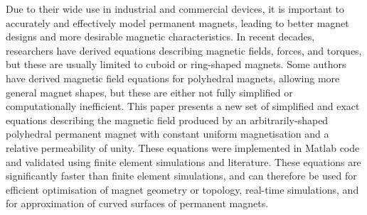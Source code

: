 Due to their wide use in industrial and commercial devices, it is important to accurately and effectively model permanent magnets, leading to better magnet designs and more desirable magnetic characteristics. In recent decades, researchers have derived equations describing magnetic fields, forces, and torques, but these are usually limited to cuboid or ring-shaped magnets. Some authors have derived magnetic field equations for polyhedral magnets, allowing more general magnet shapes, but these are either not fully simplified or computationally inefficient. This paper presents a new set of simplified and exact equations describing the magnetic field produced by an arbitrarily-shaped polyhedral permanent magnet with constant uniform magnetisation and a relative permeability of unity. These equations were implemented in Matlab code and validated using finite element simulations and literature. These equations are significantly faster than finite element simulations, and can therefore be used for efficient optimisation of magnet geometry or topology, real-time simulations, and for approximation of curved surfaces of permanent magnets.